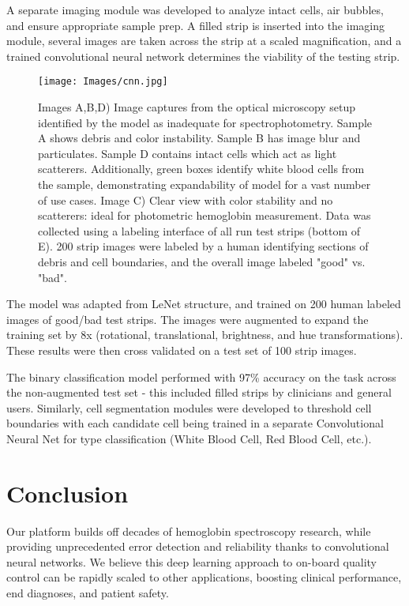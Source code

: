 \documentclass{article}
\begin{document}
A separate imaging module was developed to analyze intact cells, air bubbles, and ensure appropriate sample prep. A filled strip is inserted into the imaging module, several images are taken across the strip at a scaled magnification, and a trained convolutional neural network determines the viability of the testing strip. 
\begin{figure*}[!ht]
\centering
    \texttt{[image: Images/cnn.jpg]}
    \caption{Images A,B,D) Image captures from the optical microscopy setup identified by the model as inadequate for spectrophotometry. Sample A shows debris and color instability. Sample B has image blur and particulates. Sample D contains intact cells which act as light scatterers. Additionally, green boxes identify white blood cells from the sample, demonstrating expandability of model for a vast number of use cases. Image C) Clear view with color stability and no scatterers: ideal for photometric hemoglobin measurement. Data was collected using a labeling interface of all run test strips (bottom of E). 200 strip images were labeled by a human identifying sections of debris and cell boundaries, and the overall image labeled "good" vs. "bad".}
    \label{fig:CNN}
\end{figure*}
The model was adapted from LeNet structure, and trained on 200 human labeled images of good/bad test strips. The images were augmented to expand the training set by 8x (rotational, translational, brightness, and hue transformations). These results were then cross validated on a test set of 100 strip images. 

The binary classification model performed with 97\% accuracy on the task across the non-augmented test set - this included filled strips by clinicians and general users. Similarly, cell segmentation modules were developed to threshold cell boundaries with each candidate cell being trained in a separate Convolutional Neural Net for type classification (White Blood Cell, Red Blood Cell, etc.). 
\section{Conclusion}
Our platform builds off decades of hemoglobin spectroscopy research, while providing unprecedented error detection and reliability thanks to convolutional neural networks. We believe this deep learning approach to on-board quality control can be rapidly scaled to other applications, boosting clinical performance, end diagnoses, and patient safety. 
\end{document}
